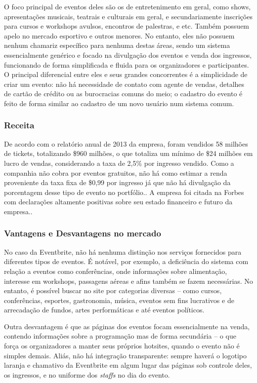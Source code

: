 \documentclass[a4paper]{abntex2}
\begin{document}
O foco principal de eventos deles são os de entretenimento em geral, como shows, apresentações musicais, teatrais e culturais em geral, e secundariamente inscrições para cursos e workshops avulsos, encontros de palestras, e etc. Também possuem apelo no mercado esportivo e outros menores. No entanto, eles não possuem nenhum chamariz específico para nenhuma destas áreas, sendo um sistema essencialmente genérico e focado na divulgação dos eventos e venda dos ingressos, funcionando de forma simplificada e fluida para os organizadores e participantes. O principal diferencial entre eles e seus grandes concorrentes é a simplicidade de criar um evento: não há necessidade de contato com agente de vendas, detalhes de cartão de crédito ou as burocracias comuns do meio; o cadastro do evento é feito de forma similar ao cadastro de um novo usuário num sistema comum.

\subsubsection*{Receita}
De acordo com o relatório anual de 2013 da empresa, foram vendidos 58 milhões de tickets, totalizando \$960 milhões, o que totaliza um mínimo de \$24 milhões em lucro de vendas, considerando a taxa de 2,5\% por ingresso vendido. Como a companhia não cobra por eventos gratuitos, não há como estimar a renda proveniente da taxa fixa de \$0,99 por ingresso já que não há divulgação da porcentagem desse tipo de evento no portfólio.\cite{eventbrite-lucro-tnw}. A empresa foi citada na Forbes com declarações altamente positivas sobre seu estado financeiro e futuro da empresa.\cite{eventbrite-lucro-forbes}.

\subsubsection*{Vantagens e Desvantagens no mercado}
No caso da Eventbrite, não há nenhuma distinção nos serviços fornecidos para diferentes tipos de eventos. É notável, por exemplo, a deficiência do sistema com relação a eventos como conferências, onde informações sobre alimentação, interesse em workshops, passagens aéreas e afins também se fazem necessárias\cite{eventbrite-review}. No entanto, é possível buscar no site por categorias diversas -- como cursos, conferências, esportes, gastronomia, música, eventos sem fins lucrativos e de arrecadação de fundos, artes performáticas e até eventos políticos.

Outra desvantagem é que as páginas dos eventos focam essencialmente na venda, contendo informações sobre a programação mas de forma secundária -- o que força os organizadores a manter seus próprios hotsites, quando o evento não é simples demais. Aliás, não há integração transparente: sempre haverá o logotipo laranja e chamativo da Eventbrite em algum lugar das páginas sob controle deles, os ingressos, e no uniforme dos \emph{staffs} no dia do evento.
\end{document}
